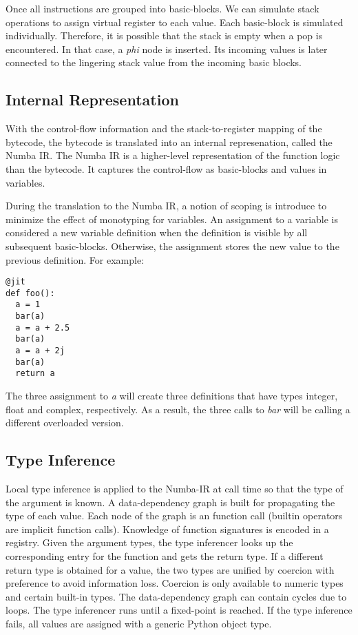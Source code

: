 \documentclass{acm_proc_article-sp}
\begin{document}
Once all instructions are grouped into basic-blocks. We can simulate stack
operations to assign virtual register to each value.  Each basic-block is
simulated individually. Therefore, it is possible that the stack is empty when
a pop is encountered. In that case, a \textit{phi} node is inserted.
Its incoming values is later connected to the lingering stack value from the
incoming basic blocks.

\subsection{Internal Representation}

With the control-flow information and the stack-to-register mapping
of the bytecode, the bytecode is translated into an internal represenation,
called the Numba IR. The Numba IR is a higher-level representation of the
function logic than the bytecode. It captures the control-flow as basic-blocks
and values in variables.

During the translation to the Numba IR, a notion of scoping is introduce to
minimize the effect of monotyping for variables. An assignment to a variable
is considered a new variable definition when the definition is visible by all
subsequent basic-blocks. Otherwise, the assignment stores the new value to
the previous definition.  For example:

\begin{lstlisting}
@jit
def foo():
  a = 1
  bar(a)
  a = a + 2.5
  bar(a)
  a = a + 2j
  bar(a)
  return a
\end{lstlisting}

The three assignment to \textit{a} will create three definitions that have
types integer, float and complex, respectively.  As a result, the three
calls to \textit{bar} will be calling a different overloaded version.

\subsection{Type Inference}

Local type inference is applied to the Numba-IR at call time so that
the type of the argument is known. A data-dependency graph is built for
propagating the type of each value.  Each node of the graph is an function call
(builtin operators are implicit function calls). Knowledge of function
signatures is encoded in a registry.
Given the argument types, the type inferencer looks up
the corresponding entry for the function and gets the return type. If a
different return type is obtained for a value, the two types are unified by
coercion with preference to avoid information loss. Coercion is only available
to numeric types and certain built-in types. The data-dependency graph can
contain cycles due to loops. The type inferencer runs until a fixed-point is
reached. If the type inference fails, all values are assigned with a generic
Python object type.
\end{document}
